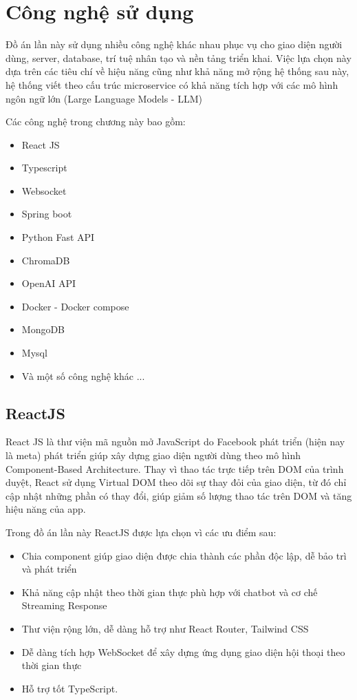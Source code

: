 \documentclass[../DoAn.tex]{subfiles}
\begin{document}
\section{Công nghệ sử dụng}
Đồ án lần này sử dụng nhiều công nghệ khác nhau phục vụ cho giao diện người dùng, server, database, trí tuệ nhân tạo và nền tảng triển khai. Việc lựa chọn này dựa trên các tiêu chí về hiệu năng cũng như khả năng mở rộng hệ thống sau này, hệ thống viết theo cấu trúc microservice có khả năng tích hợp với các mô hình ngôn ngữ lớn (Large Language Models - LLM)

Các công nghệ trong chương này bao gồm:
\begin{itemize}
    \item React JS
    \item Typescript
    \item Websocket
    \item Spring boot
    \item Python Fast API
    \item ChromaDB
    \item OpenAI API
    \item Docker - Docker compose
    \item MongoDB 
    \item Mysql
    \item Và một số công nghệ khác ...
\end{itemize}

\subsection{ReactJS}
React JS là thư viện mã nguồn mở JavaScript do Facebook phát triển (hiện nay là meta)
phát triển giúp xây dựng giao diện người dùng theo mô hình Component-Based Architecture.
Thay vì thao tác trực tiếp trên DOM của trình duyệt, React sử dụng Virtual DOM theo dõi
sự thay đỏi của giao diện, từ đó chỉ cập nhật những phần có thay đổi, giúp giảm số lượng
thao tác trên DOM và tăng hiệu năng của app.

Trong đồ án lần này ReactJS được lựa chọn vì các ưu điểm sau:
\begin{itemize}
    \item Chia component giúp giao diện được chia thành các phần độc lập, dễ bảo trì và phát triển
    \item Khả năng cập nhật theo thời gian thực phù hợp với chatbot và cơ chế Streaming Response
    \item Thư viện rộng lớn, dễ dàng hỗ trợ như React Router, Tailwind CSS
    \item Dễ dàng tích hợp WebSocket để xây dựng ứng dụng giao diện hội thoại theo thời gian thực
    \item Hỗ trợ tốt TypeScript.
\end{itemize}
\end{document}
